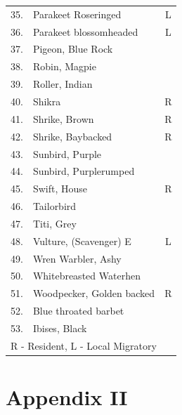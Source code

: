 \begin{longtable}{cp{5cm}c}
35.& Parakeet Roseringed &L \\
36.& Parakeet blossomheaded &L\\ 
37.& Pigeon, Blue Rock & \\
38.& Robin, Magpie &\\
39.& Roller, Indian &\\
40.& Shikra &R \\
41.& Shrike, Brown &R \\
42.& Shrike, Baybacked &R \\
43.& Sunbird, Purple & \\
44.& Sunbird, Purplerumped &\\
45.& Swift, House & R\\
46.& Tailorbird & \\
47.& Titi, Grey & \\
48. & Vulture, (Scavenger) E  & L \\ 
49.& Wren Warbler,  Ashy &  \\
50. & Whitebreasted Waterhen & \\ 
51. & Woodpecker, Golden backed & R \\
52. & Blue throated barbet  & \\
53. & Ibises, Black & \\[0.3cm]
\multicolumn{3}{l}{\qquad R - Resident, \qquad L - Local Migratory}
\end{longtable}

\newpage

\chapter*{Appendix II}

